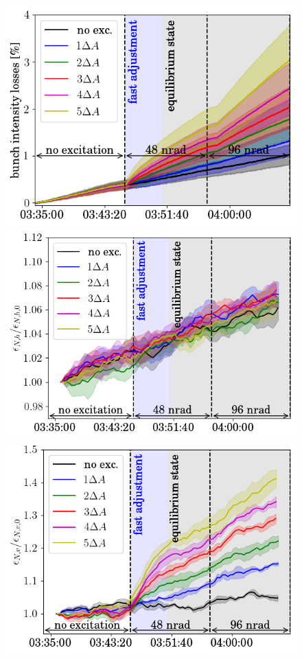 \documentclass[%
 reprint,
 amsmath,amssymb,
 aps,
prstab,
]{revtex4-1}
\begin{document}
\begin{figure}[h]
	\begin{minipage}[t]{1.0\linewidth}
		\centering
		\includegraphics[width=0.49\linewidth]{2016_bunch_intensity_v10th_no_damper_avg.png}
	\end{minipage}
	\begin{minipage}[t]{0.49\linewidth}
		\centering
		\includegraphics[width=1.0\linewidth]{2016_emith_avg_rel_v10th_no_damper.png}
	\end{minipage}	
	\begin{minipage}[t]{0.49\linewidth}
		\centering
		\includegraphics[width=1.0\linewidth]{2016_emitv_avg_rel_v10th_no_damper.png}

\end{minipage}
\end{figure}
\end{document}
